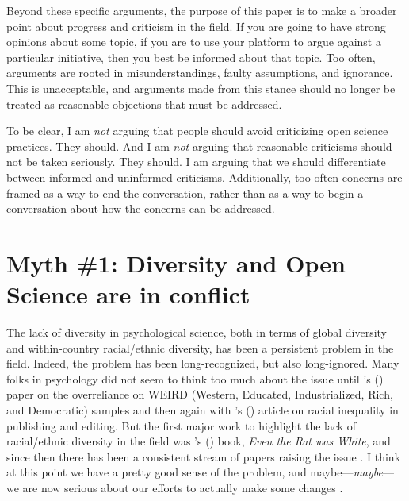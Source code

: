 \documentclass[authordate, empirical]{jote-new-article}
\begin{document}
Beyond these specific arguments, the purpose of this paper is to make a broader point about progress and criticism in the field. If you are going to have strong opinions about some topic, if you are to use your platform to argue against a particular initiative, then you best be informed about that topic. Too often, arguments are rooted in misunderstandings, faulty assumptions, and ignorance. This is unacceptable, and arguments made from this stance should no longer be treated as reasonable objections that must be addressed.







To be clear, I am \emph{not} arguing that people should avoid criticizing open science practices. They should. And I am \emph{not} arguing that reasonable criticisms should not be taken seriously. They should. I am arguing that we should differentiate between informed and uninformed criticisms. Additionally, too often concerns are framed as a way to end the conversation, rather than as a way to begin a conversation about how the concerns can be addressed.







\section{Myth \#1: Diversity and Open Science are in conflict}







The lack of diversity in psychological science, both in terms of global diversity and within-country racial/ethnic diversity, has been a persistent problem in the field. Indeed, the problem has been long-recognized, but also long-ignored. Many folks in psychology did not seem to think too much about the issue until \citeauthor{Henrich2010}'s (\hspace*{-2pt}\citeyear{Henrich2010}) paper on the overreliance on WEIRD (Western, Educated, Industrialized, Rich, and Democratic) samples and then again with \citeauthor{Roberts2020}'s (\hspace*{-2pt}\citeyear{Roberts2020}) article on racial inequality in publishing and editing. But the first major work to highlight the lack of racial/ethnic diversity in the field was \citeauthor{Guthrie1976}'s (\hspace*{-2pt}\citeyear{Guthrie1976}) book, \emph{Even the Rat was White}, and since then there has been a consistent stream of papers raising the issue \parencites[e.g.,][]{Arnett2008}{Draper2022}{Graham1992}{Green2022}{Hall2001}{Hartmann2013}{Lin2022}{Moriguchi2022}{Nielsen2017}{Ponterotto1988}{Thalmayer2021}. I think at this point we have a pretty good sense of the problem, and maybe—\emph{maybe}—we are now serious about our efforts to actually make some changes \parencites[see][for a discussion of the complexities of the issue]{Syed2023}.
\end{document}
